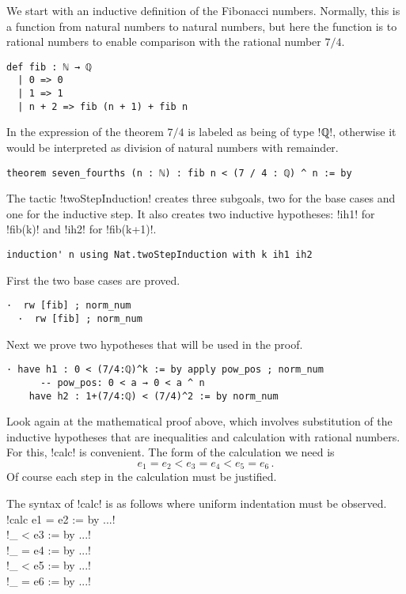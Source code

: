 We start with an inductive definition of the Fibonacci numbers. Normally, this is a function from natural numbers to natural numbers, but here the function is to rational numbers to enable comparison with the rational number $7/4$.
\begin{Verbatim}
def fib : ℕ → ℚ
  | 0 => 0
  | 1 => 1
  | n + 2 => fib (n + 1) + fib n
\end{Verbatim}
In the expression of the theorem $7/4$ is labeled as being of type !ℚ!, otherwise it would be interpreted as division of natural numbers with remainder.
\begin{Verbatim}[firstnumber=last]
theorem seven_fourths (n : ℕ) : fib n < (7 / 4 : ℚ) ^ n := by
\end{Verbatim}
The tactic !twoStepInduction! creates three subgoals, two for the base cases and one for the inductive step. It also creates two inductive hypotheses: !ih1! for !fib(k)! and !ih2! for !fib(k+1)!.
\begin{Verbatim}[firstnumber=last]
  induction' n using Nat.twoStepInduction with k ih1 ih2
\end{Verbatim}


First the two base cases are proved.
\begin{Verbatim}[firstnumber=last]
  ·  rw [fib] ; norm_num
  ·  rw [fib] ; norm_num
\end{Verbatim}

Next we prove two hypotheses that will be used in the proof.
\begin{Verbatim}[firstnumber=last]
  · have h1 : 0 < (7/4:ℚ)^k := by apply pow_pos ; norm_num
      -- pow_pos: 0 < a → 0 < a ^ n
    have h2 : 1+(7/4:ℚ) < (7/4)^2 := by norm_num
\end{Verbatim}

Look again at the mathematical proof above, which involves substitution of the inductive hypotheses that are inequalities and calculation with rational numbers. For this, !calc! is convenient. The form of the calculation we need is
\[
e_1 = e_2 < e_3 = e_4 < e_5 = e_6\,.
\]
Of course each step in the calculation must be justified.

The syntax of !calc! is as follows where uniform indentation must be observed.\\
\indnt{}!calc e1 = e2 := by ...!\\
\indnt{}\indnt{}!_ < e3 := by ...!\\
\indnt{}\indnt{}!_ = e4 := by ...!\\
\indnt{}\indnt{}!_ < e5 := by ...!\\
\indnt{}\indnt{}!_ = e6 := by ...!

